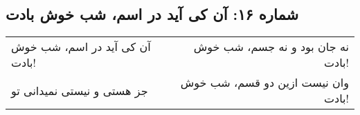 \begin{center}
\section*{شماره ۱۶: آن کی آید در اسم، شب خوش بادت}
\label{sec:016}
\begin{longtable}{l p{0.5cm} r}
آن کی آید در اسم، شب خوش بادت!
&&
نه جان بود و نه جسم، شب خوش بادت!
\\
جز هستی و نیستی نمیدانی تو
&&
وان نیست ازین دو قسم، شب خوش بادت!
\\
\end{longtable}
\end{center}
